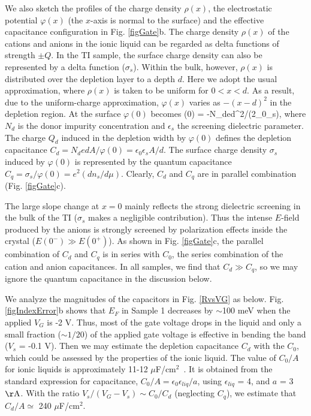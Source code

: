 We also sketch the profiles of the charge density $\rho(x)$, the 
electrostatic potential $\varphi(x)$ (the $x$-axis is normal to the surface) and the effective capacitance configuration in Fig. \ref{figGate}b. 
The charge density $\rho(x)$ of the cations and anions in the ionic liquid can be regarded as
delta functions of strength $\pm Q$. In the TI sample, the surface charge density can also be represented by
a delta function ($\sigma_s$). Within the bulk, however, $\rho(x)$ is distributed 
over the depletion layer to a depth $d$. Here we adopt the usual approximation, 
where $\rho(x)$ is taken to be uniform for $0<x<d$. 
As a result, due to the uniform-charge approximation, $\varphi(x)$ varies as $-(x-d)^2$ in the depletion region.
At the surface $\varphi(0)$ becomes
\be
\varphi(0) = -N_ded^2/(2\epsilon_0\epsilon_s),
\label{phi0}
\ee
where $N_d$ is the donor impurity concentration and $\epsilon_s$ the screening dielectric parameter.
The charge $Q_d$ induced in the depletion width by $\varphi(0)$ defines the depletion capacitance
$C_d = N_dedA/\varphi(0) = \epsilon_0\epsilon_s A/d$. The surface charge density $\sigma_s$ 
induced by $\varphi(0)$ is represented by the quantum capacitance
$C_q = \sigma_s/\varphi(0) = e^2(dn_s/d\mu)$. Clearly, $C_d$ and $C_q$ are in parallel
combination (Fig. \ref{figGate}c).

The large slope change at $x=0$ mainly reflects the strong dielectric screening in the bulk of the
TI ($\sigma_s$ makes a negligible contribution). Thus the intense $E$-field produced by the
anions is strongly screened by polarization effects inside the crystal ($E(0^-)\gg E(0^+)$). 
As shown in Fig. \ref{figGate}c, the parallel combination of $C_d$ and $C_q$ is in 
series with $C_0$, the series combination of the cation and anion capacitances.
In all samples, we find that $C_d\gg C_q$, so we may ignore the quantum capacitance in the discussion below.

We analyze the magnitudes of the capacitors in Fig. \ref{RvsVG} as below. Fig. \ref{figIndexError}b shows that $E_F$ in Sample 1 decreases by $\sim$100 meV when the applied $V_G$ is -2 V.
Thus, most of the gate voltage drops in the liquid and only a small fraction ($\sim 1/20$) of the applied gate voltage is effective in bending the band ($V_s$ = -0.1 V).
Then we may estimate the depletion capacitance $C_d$ with the $C_0$, which could be assessed by the properties of the ionic liquid.
The value of $C_0/A$ for ionic liquids is approximately 11-12 $\mu$F/cm$^2$~\cite{Koch}.
It is obtained from the standard expression for capacitance, $C_0/A = \epsilon_0\epsilon_{liq}/a$, using $\epsilon_{liq}$ = 4, and $a$ = 3 $\rm\AA$. With the ratio $V_s/(V_G-V_s)\sim C_0/C_d$ (neglecting $C_q$), we estimate that $C_d/A\simeq$ 240 $\mu$F/cm$^2$.

